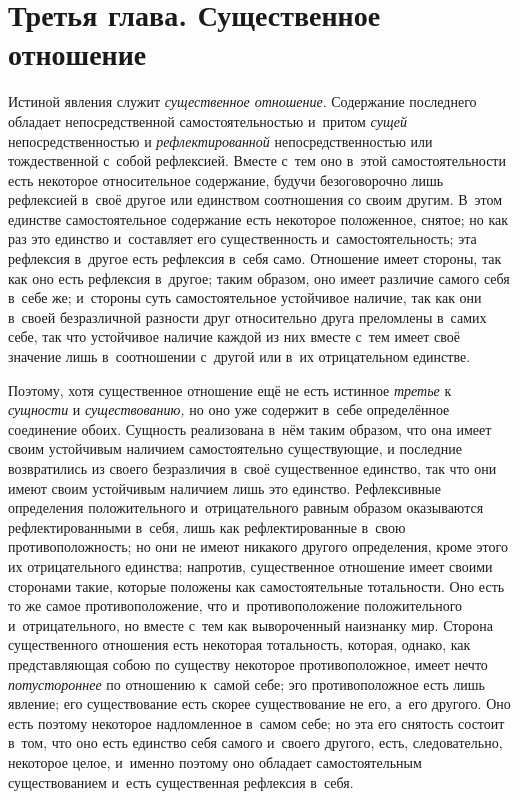 \chapter[{\em Третья глава} Существенное отношение]
{Третья глава. Существенное отношение}

Истиной явления служит {\em существенное отношение}. Содержание последнего
обладает непосредственной самостоятельностью и~притом {\em сущей}
непосредственностью и {\em рефлектированной} непосредственностью или
тождественной с~собой рефлексией. Вместе с~тем оно в~этой самостоятельности
есть некоторое относительное содержание, будучи безоговорочно лишь
рефлексией в~своё другое или единством соотношения со своим другим. В~этом
единстве самостоятельное содержание есть некоторое положенное, снятое; но
как раз это единство и~составляет его существенность и~самостоятельность;
эта рефлексия в~другое есть рефлексия в~себя само. Отношение имеет стороны,
так как оно есть рефлексия в~другое; таким образом, оно имеет различие
самого себя в~себе же; и~стороны суть самостоятельное устойчивое наличие,
так как они в~своей безразличной разности друг относительно друга преломлены
в~самих себе, так что устойчивое наличие каждой из них вместе с~тем имеет
своё значение лишь в~соотношении с~другой или в~их отрицательном единстве.

Поэтому, хотя существенное отношение ещё не есть истинное {\em третье}
к {\em сущности} и {\em существованию,} но оно уже содержит в~себе
определённое соединение обоих. Сущность реализована в~нём таким образом,
что она имеет своим устойчивым наличием самостоятельно существующие, и
последние возвратились из своего безразличия в~своё существенное единство,
так что они имеют своим устойчивым наличием лишь это единство. Рефлексивные
определения положительного и~отрицательного равным образом оказываются
рефлектированными в~себя, лишь как рефлектированные в~свою
противоположность; но они не имеют никакого другого определения, кроме
этого их отрицательного единства; напротив, существенное отношение имеет
своими сторонами такие, которые положены как самостоятельные тотальности.
Оно есть то же самое противоположение, что и~противоположение
положительного и~отрицательного, но вместе с~тем как вывороченный наизнанку
мир. Сторона существенного отношения есть некоторая тотальность, которая,
однако, как представляющая собою по существу некоторое противоположное,
имеет нечто {\em потустороннее} по отношению к~самой
себе; эго противоположное есть лишь явление; его существование есть скорее
существование не его, а~его другого. Оно есть поэтому некоторое
надломленное в~самом себе; но эта его снятость состоит в~том, что оно есть
единство себя самого и~своего другого, есть, следовательно, некоторое
целое, и~именно поэтому оно обладает самостоятельным существованием и~есть
существенная рефлексия в~себя.

